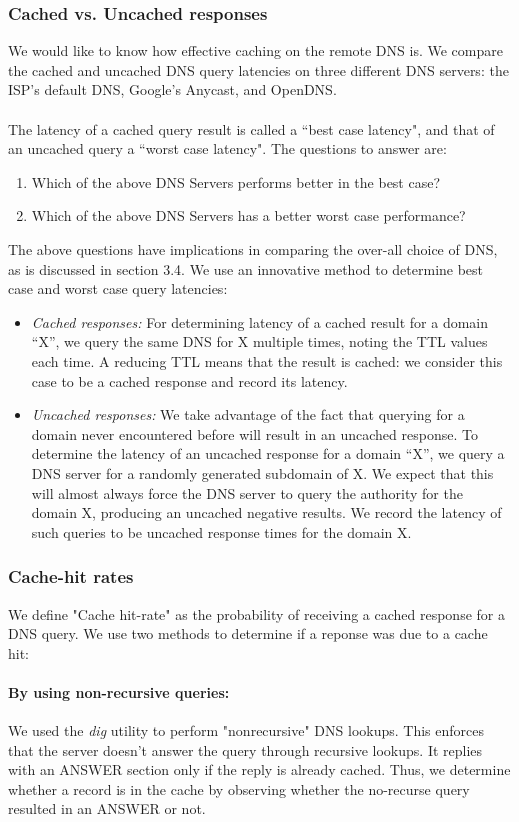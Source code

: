 \documentclass[twocolumn]{article}
\begin{document}
\subsubsection{Cached vs. Uncached responses}
We would like to know how effective caching on the remote DNS is. We compare the cached and uncached DNS query latencies on three different DNS servers: the ISP’s default DNS, Google’s Anycast, and OpenDNS.
\\
\\
The latency of a cached query result is called a ``best case latency", and that of an uncached query a ``worst case latency". The questions to answer are:
\begin{enumerate}
\item Which of the above DNS Servers performs better in the best case?
\item Which of the above DNS Servers has a better worst case performance?
\end{enumerate}
The above questions have implications in comparing the over-all choice of DNS, as is discussed in section 3.4. We use an innovative method to determine best case and worst case query latencies:
\begin{itemize}
\item \textit{Cached responses:} For determining latency of a cached result for a domain “X”, we query the same DNS for X multiple times, noting the TTL values each time. A reducing TTL means that the result is cached: we consider this case to be a cached response and record its latency.
\item \textit{Uncached responses:} We take advantage of the fact that querying for a domain never encountered before will result in an uncached response. To determine the latency of an uncached response for a domain “X”, we query a DNS server for a randomly generated subdomain of X. We expect that this will almost always force the DNS server to query the authority for the domain X, producing an uncached negative results. We record the latency of such queries to be uncached response times for the domain X.
\end{itemize}
\subsubsection{Cache-hit rates}
We define "Cache hit-rate" as the probability of receiving a cached response for a DNS query.
We use two methods to determine if a reponse was due to a cache hit:
\paragraph{By using non-recursive queries:} We used the \textit{dig} utility to perform "nonrecursive" DNS lookups. This enforces that the server doesn’t answer the query through recursive lookups. It replies with an ANSWER section only if the reply is already cached. Thus, we determine whether a record is in the cache by observing whether the no-recurse query resulted in an ANSWER or not.
\end{document}
